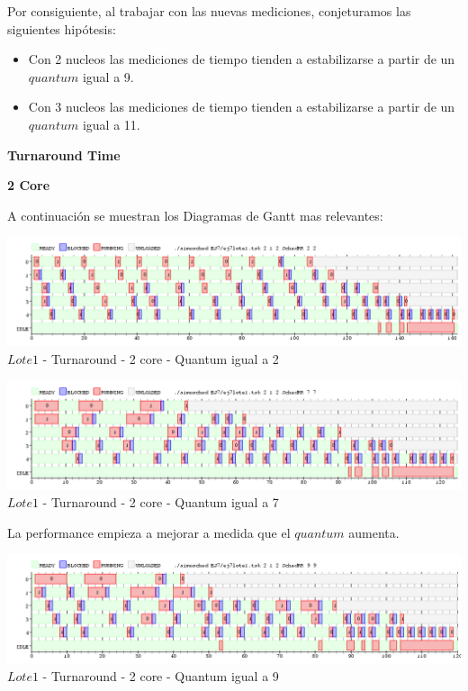  \indent Por consiguiente, al trabajar con las nuevas mediciones, conjeturamos las siguientes hipótesis:
 
 \begin{itemize}
  \item Con 2 nucleos las mediciones de tiempo tienden a estabilizarse a partir de un $quantum$ igual a 9.
  \item Con 3 nucleos las mediciones de tiempo tienden a estabilizarse a partir de un $quantum$ igual a 11.
 \end{itemize}
 \begin{center}
 \textbf{Turnaround Time} 
  \end{center}

 \begin{center}
 \textbf{2 Core}
 \end{center}
  A continuación se muestran los Diagramas de Gantt mas relevantes:
  
  \begin{center}
    	\includegraphics[width=450pt]{./EJ7/ej7tour2core1quan.png}
	{$Lote 1$ - Turnaround - 2 core - Quantum igual a 2}	
 \end{center}

   \begin{center}
    	\includegraphics[width=450pt]{./EJ7/ej7tour2core3quan.png}
	{$Lote 1$ - Turnaround - 2 core - Quantum igual a 7}	
 \end{center}
 
 
 \indent La performance empieza a mejorar a medida que el $quantum$ aumenta.
 
   \begin{center}
    	\includegraphics[width=450pt]{./EJ7/ej7tour2core4quan.png}
	{$Lote 1$ - Turnaround - 2 core - Quantum igual a 9}	
 \end{center}


